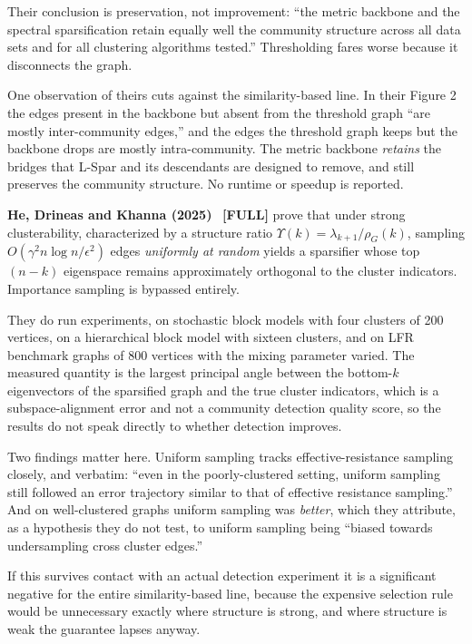 \documentclass[10pt,a4paper]{article}
\begin{document}
Their conclusion is preservation, not improvement: ``the metric backbone and the spectral
sparsification retain equally well the community structure across all data sets and for all
clustering algorithms tested.'' Thresholding fares worse because it disconnects the graph.

One observation of theirs cuts against the similarity-based line. In their Figure 2 the edges
present in the backbone but absent from the threshold graph ``are mostly inter-community edges,''
and the edges the threshold graph keeps but the backbone drops are mostly intra-community. The
metric backbone \emph{retains} the bridges that L-Spar and its descendants are designed to remove,
and still preserves the community structure. No runtime or speedup is reported.

\textbf{He, Drineas and Khanna (2025)}~\cite{he2025structure} \textbf{[FULL]} prove that
under strong clusterability, characterized by a structure ratio
$\Upsilon(k) = \lambda_{k+1}/\rho_G(k)$, sampling $O(\gamma^2 n \log n / \epsilon^2)$ edges
\emph{uniformly at random} yields a sparsifier whose top $(n-k)$ eigenspace remains approximately
orthogonal to the cluster indicators. Importance sampling is bypassed entirely.

They do run experiments, on stochastic block models with four clusters of 200 vertices, on a
hierarchical block model with sixteen clusters, and on LFR benchmark graphs of 800 vertices with
the mixing parameter varied. The measured quantity is the largest principal angle between the
bottom-$k$ eigenvectors of the sparsified graph and the true cluster indicators, which is a
subspace-alignment error and not a community detection quality score, so the results do not speak
directly to whether detection improves.

Two findings matter here. Uniform sampling tracks effective-resistance sampling closely, and
verbatim: ``even in the poorly-clustered setting, uniform sampling still followed an error
trajectory similar to that of effective resistance sampling.'' And on well-clustered graphs
uniform sampling was \emph{better}, which they attribute, as a hypothesis they do not test, to
uniform sampling being ``biased towards undersampling cross cluster edges.''

If this survives contact with an actual detection experiment it is a significant negative for the
entire similarity-based line, because the expensive selection rule would be unnecessary exactly
where structure is strong, and where structure is weak the guarantee lapses anyway.
\end{document}
